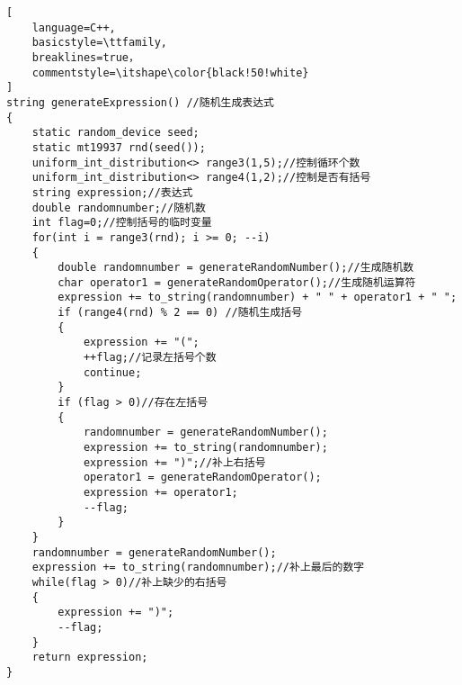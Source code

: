 \documentclass[UTF8]{ctexart}
\begin{document}
\begin{lstlisting}[
    language=C++,
    basicstyle=\ttfamily,
    breaklines=true，
    commentstyle=\itshape\color{black!50!white}
]
string generateExpression() //随机生成表达式
{   
    static random_device seed;
    static mt19937 rnd(seed());
    uniform_int_distribution<> range3(1,5);//控制循环个数
    uniform_int_distribution<> range4(1,2);//控制是否有括号
    string expression;//表达式
    double randomnumber;//随机数
    int flag=0;//控制括号的临时变量
    for(int i = range3(rnd); i >= 0; --i)
    {
        double randomnumber = generateRandomNumber();//生成随机数
        char operator1 = generateRandomOperator();//生成随机运算符
        expression += to_string(randomnumber) + " " + operator1 + " ";
        if (range4(rnd) % 2 == 0) //随机生成括号
        { 
            expression += "(";
            ++flag;//记录左括号个数
            continue;
        }
        if (flag > 0)//存在左括号
        {
            randomnumber = generateRandomNumber();
            expression += to_string(randomnumber);
            expression += ")";//补上右括号
            operator1 = generateRandomOperator();
            expression += operator1;
            --flag;
        }
    }
    randomnumber = generateRandomNumber();
    expression += to_string(randomnumber);//补上最后的数字
    while(flag > 0)//补上缺少的右括号
    {
        expression += ")";
        --flag;
    }
    return expression;
}
\end{lstlisting}
\end{document}
